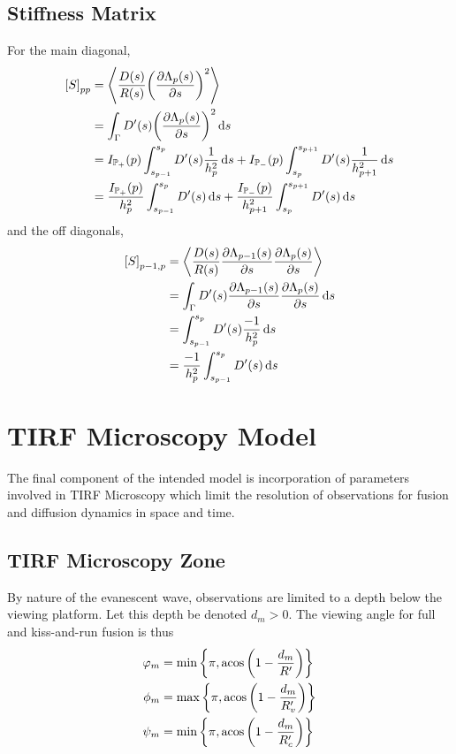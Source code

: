 \documentclass{report}
\newcommand\Par[1]{{ \left({#1}\right) }}
\newcommand\Brack[1]{{ \left[{#1}\right] }}
\newcommand\Brace[1]{{ \left\{{#1}\right\} }}
\newcommand\Angle[1]{{ \left\langle{#1}\right\rangle }}
\newcommand\bbP{{ \mathbb{P} }}
\newcommand\D{{ D' }}
\newcommand\R{{ R' }}
\newcommand\Rc{{ R'_c }}
\newcommand\Rv{{ R'_v }}
\begin{document}
\section{Stiffness Matrix}
For the main diagonal,
\begin{align*}
	\Brack{S}_{pp} &= \Angle{\frac{D(s)}{R(s)} \Par{\pdv{\Lambda_p(s)}{s}}^2} \\
	&= \int_\Gamma \D(s) \Par{\pdv{\Lambda_p(s)}{s}}^2 \dd{s} \\
	&= I_{\bbP_+}(p) \int_{s_{p-1}}^{s_p} \D(s) \frac{1}{h_p^2} \dd{s} + I_{\bbP_-}(p) \int_{s_p}^{s_{p+1}} \D(s) \frac{1}{h_{p+1}^2} \dd{s} \\
	&= \frac{I_{\bbP_+}(p)}{h_p^2} \int_{s_{p-1}}^{s_p} \D(s) \dd{s} + \frac{I_{\bbP_-}(p)}{h_{p+1}^2} \int_{s_p}^{s_{p+1}} \D(s) \dd{s}
\end{align*}
and the off diagonals,
\begin{align*}
	\Brack{S}_{p-1, p} &= \Angle{\frac{D(s)}{R(s)} \pdv{\Lambda_{p-1}(s)}{s} \pdv{\Lambda_p(s)}{s}} \\
	&= \int_\Gamma \D(s) \pdv{\Lambda_{p-1}(s)}{s} \pdv{\Lambda_p(s)}{s} \dd{s} \\
	&= \int_{s_{p-1}}^{s_p} \D(s) \frac{-1}{h_p^2} \dd{s} \\
	&= \frac{-1}{h_p^2} \int_{s_{p-1}}^{s_p} \D(s) \dd{s}
\end{align*}

\chapter{TIRF Microscopy Model}
The final component of the intended  model is incorporation of parameters involved in TIRF Microscopy which limit the resolution of observations for fusion and diffusion dynamics in space and time.

\section{TIRF Microscopy Zone}
By nature of the evanescent wave, observations are limited to a depth below the viewing platform. Let this depth be denoted $d_m > 0$. The viewing angle for full and kiss-and-run fusion is thus
\begin{align*}
	\varphi_m &= \min\Brace{\pi, \acos\Par{1 - \frac{d_m}{\R}}} \\
	\phi_m &= \max\Brace{\pi, \acos\Par{1 - \frac{d_m}{\Rv}}} \\
	\psi_m &= \min\Brace{\pi, \acos\Par{1 - \frac{d_m}{\Rc}}}
\end{align*}
\end{document}
